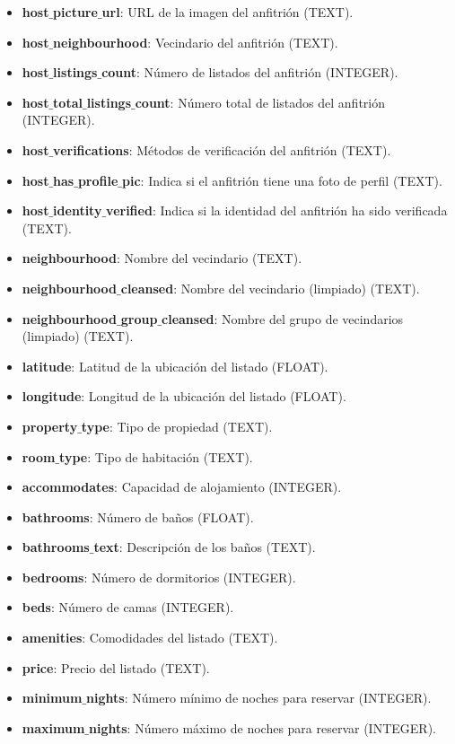 \begin{itemize}[topsep=0pt, partopsep=0pt, itemsep=0pt, parsep=0pt]
\item \textbf{host$\_$picture$\_$url}: URL de la imagen del anfitrión (TEXT).
\item \textbf{host$\_$neighbourhood}: Vecindario del anfitrión (TEXT).
\item \textbf{host$\_$listings$\_$count}: Número de listados del anfitrión (INTEGER).
\item \textbf{host$\_$total$\_$listings$\_$count}: Número total de listados del anfitrión (INTEGER).
\item \textbf{host$\_$verifications}: Métodos de verificación del anfitrión (TEXT).
\item \textbf{host$\_$has$\_$profile$\_$pic}: Indica si el anfitrión tiene una foto de perfil (TEXT).
\item \textbf{host$\_$identity$\_$verified}: Indica si la identidad del anfitrión ha sido verificada (TEXT).
\item \textbf{neighbourhood}: Nombre del vecindario (TEXT).
\item \textbf{neighbourhood$\_$cleansed}: Nombre del vecindario (limpiado) (TEXT).
\item \textbf{neighbourhood$\_$group$\_$cleansed}: Nombre del grupo de vecindarios (limpiado) (TEXT).
\item \textbf{latitude}: Latitud de la ubicación del listado (FLOAT).
\item \textbf{longitude}: Longitud de la ubicación del listado (FLOAT).
\item \textbf{property$\_$type}: Tipo de propiedad (TEXT).
\item \textbf{room$\_$type}: Tipo de habitación (TEXT).
\item \textbf{accommodates}: Capacidad de alojamiento (INTEGER).
\item \textbf{bathrooms}: Número de baños (FLOAT).
\item \textbf{bathrooms$\_$text}: Descripción de los baños (TEXT).
\item \textbf{bedrooms}: Número de dormitorios (INTEGER).
\item \textbf{beds}: Número de camas (INTEGER).
\item \textbf{amenities}: Comodidades del listado (TEXT).
\item \textbf{price}: Precio del listado (TEXT).
\item \textbf{minimum$\_$nights}: Número mínimo de noches para reservar (INTEGER).
\item \textbf{maximum$\_$nights}: Número máximo de noches para reservar (INTEGER).

\end{itemize}
